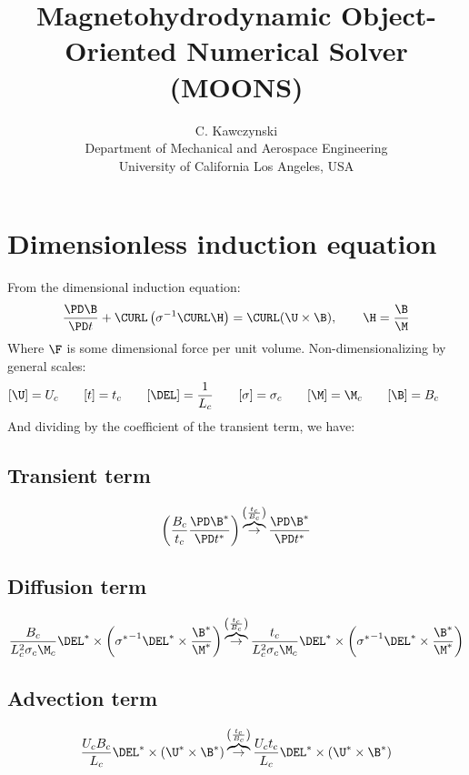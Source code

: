 \documentclass[11pt]{article}
\newcommand{\OB}{\overbrace{\rightarrow}^{\left(\frac{t_c}{B_c}\right)}}
\begin{document}
\doublespacing
\title{Magnetohydrodynamic Object-Oriented Numerical Solver (MOONS)}
\author{C. Kawczynski \\
Department of Mechanical and Aerospace Engineering \\
University of California Los Angeles, USA\\
}
\maketitle

\section{Dimensionless induction equation}
From the dimensional induction equation:
\begin{equation}
	\frac{\PD \B}{\PD t} + \CURL \left( \sigma^{-1}\CURL \H \right)
	= \CURL (\U \times \B), \qquad \H = \frac{\B}{\M}
\end{equation}
Where $\F$ is some dimensional force per unit volume. Non-dimensionalizing by general scales:
\begin{equation}\begin{aligned}
	[\U] = U_c \qquad
	[t] = t_c \qquad
	[\DEL] = \frac{1}{L_c} \qquad
	[\sigma] = \sigma_c \qquad
	[\M] = \M_c \qquad
	[\B] = B_c \qquad
\end{aligned}\end{equation}
And dividing by the coefficient of the transient term, we have:
\subsection{Transient term}
\begin{equation}
	\left( \frac{B_c}{t_c} \frac{\PD \B^*}{\PD t^*} \right)
	\OB
	\frac{\PD \B^*}{\PD t^*}
\end{equation}
\subsection{Diffusion term}
\begin{equation}
	\frac{B_c}{L_c^2 \sigma_c \M_c} \DEL^* \times \left( {\sigma^*}^{-1}\DEL^* \times \frac{\B^*}{\M^*} \right)
	\OB
	\frac{t_c}{L_c^2 \sigma_c \M_c} \DEL^* \times \left( {\sigma^*}^{-1}\DEL^* \times \frac{\B^*}{\M^*} \right)
\end{equation}
\subsection{Advection term}
\begin{equation}
	\frac{U_c B_c}{L_c} \DEL^* \times (\U^* \times \B^*)
	\OB
	\frac{U_c t_c}{L_c} \DEL^* \times (\U^* \times \B^*)
\end{equation}
\end{document}
